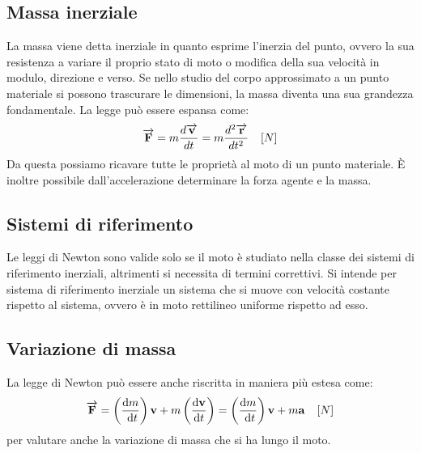 \documentclass[class=book, crop=false, oneside, 12pt]{standalone}
\begin{document}
\subsection{Massa inerziale}
La massa viene detta inerziale in quanto esprime l'inerzia del punto, ovvero la sua resistenza a variare il proprio stato di moto o modifica della sua velocit\`a in modulo, direzione e verso.
Se nello studio del corpo approssimato a un punto materiale si possono trascurare le dimensioni, la massa diventa una sua grandezza fondamentale.
La legge può essere espansa come:
\begin{equation}
    \overrightarrow{F} = m \frac{d\overrightarrow{v}}{dt} = m \frac{d^2 \overrightarrow{r}}{dt^2} \ \udm{N}
\end{equation}
Da questa possiamo ricavare tutte le proprietà al moto di un punto materiale.
\`E inoltre possibile dall'accelerazione determinare la forza agente e la massa.
\subsection{Sistemi di riferimento}
Le leggi di Newton sono valide solo se il moto è studiato nella classe dei sistemi di riferimento inerziali, altrimenti si necessita di termini correttivi.
Si intende per sistema di riferimento inerziale un sistema che si muove con velocit\`a costante rispetto al sistema, ovvero \`e in moto rettilineo uniforme rispetto ad esso.
\subsection{Variazione di massa}
La legge di Newton può essere anche riscritta in maniera più estesa come:
\begin{equation}
    \overrightarrow{F}=\left(\frac{\mathrm{d} m}{\mathrm{~d} t}\right) \mathbf{v}+m\left(\frac{\mathrm{d} \mathbf{v}}{\mathrm{d} t}\right)=\left(\frac{\mathrm{d} m}{\mathrm{~d} t}\right) \mathbf{v}+m \mathbf{a} \ \udm{N}
\end{equation}
per valutare anche la variazione di massa che si ha lungo il moto.
\end{document}

